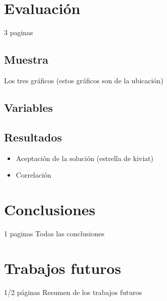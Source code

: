 \documentclass[conference]{IEEEtran}
\begin{document}
\section{Evaluación}

3 paginas
\subsection{Muestra}
Los tres gráficos (estos gráficos son de la ubicación)
\subsection{Variables}
\subsection{Resultados}
\begin{itemize}
\item Aceptación de la solución (estrella de kiviat)
\item Correlación
\end{itemize}

\section{Conclusiones}
1 paginas
Todas las conclusiones

\section{Trabajos futuros}
1/2 páginas
Resumen de los trabajos futuros

\printbibliography{}
\end{document}
